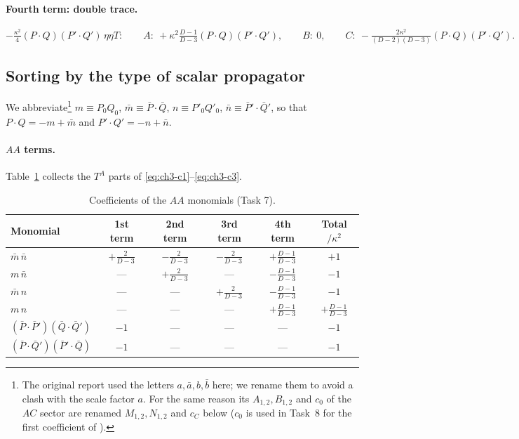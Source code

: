 \paragraph{Fourth term: double trace.}
\begin{equation}
-\tfrac{\kappa^2}4(P\!\cdot\!Q)(P'\!\cdot\!Q')\,\eta\eta T:\qquad A:\ +\kappa^2\tfrac{D-1}{D-3}(P\!\cdot\!Q)(P'\!\cdot\!Q'),\qquad B:\ 0,\qquad
C:\ -\tfrac{2\kappa^2}{(D-2)(D-3)}(P\!\cdot\!Q)(P'\!\cdot\!Q').
\label{eq:ch3-c3}
\end{equation}

\subsection{Sorting by the type of scalar propagator \tD}

We abbreviate\footnote{The original report used the letters $a,\bar a,b,\bar b$ here; we rename them to avoid a clash with the scale factor $a$.
For the same reason its $A_{1,2},B_{1,2}$ and $c_0$ of the $AC$ sector are renamed $M_{1,2},N_{1,2}$ and $c_C$ below ($c_0$ is used in Task~8 for the first coefficient of ).}
$m\equiv P_0Q_0$, $\bar m\equiv\bar P\!\cdot\!\bar Q$, $n\equiv P'_0Q'_0$, $\bar n\equiv\bar P'\!\cdot\!\bar Q'$, so that $P\!\cdot\!Q=-m+\bar m$ and $P'\!\cdot\!Q'=-n+\bar n$.

\paragraph{$AA$ terms.}
Table~\ref{tab:ch3-AA} collects the $T^A$ parts of \eqref{eq:ch3-c1}--\eqref{eq:ch3-c3}.
\begin{table}[h]
\centering
\renewcommand{\arraystretch}{1.3}
\begin{tabular}{lccccc}
\toprule
Monomial & 1st term & 2nd term & 3rd term & 4th term & Total$/\kappa^2$\\
\midrule
$\bar m\,\bar n$ & $+\tfrac2{D-3}$ & $-\tfrac2{D-3}$ & $-\tfrac2{D-3}$ & $+\tfrac{D-1}{D-3}$ & $+1$\\
$m\,\bar n$ & --- & $+\tfrac2{D-3}$ & --- & $-\tfrac{D-1}{D-3}$ & $-1$\\
$\bar m\,n$ & --- & --- & $+\tfrac2{D-3}$ & $-\tfrac{D-1}{D-3}$ & $-1$\\
$m\,n$ & --- & --- & --- & $+\tfrac{D-1}{D-3}$ & $+\tfrac{D-1}{D-3}$\\
$(\bar P\!\cdot\!\bar P')(\bar Q\!\cdot\!\bar Q')$ & $-1$ & --- & --- & --- & $-1$\\
$(\bar P\!\cdot\!\bar Q')(\bar P'\!\cdot\!\bar Q)$ & $-1$ & --- & --- & --- & $-1$\\
\bottomrule
\end{tabular}
\caption{Coefficients of the $AA$ monomials (Task 7).}
\label{tab:ch3-AA}
\end{table}

